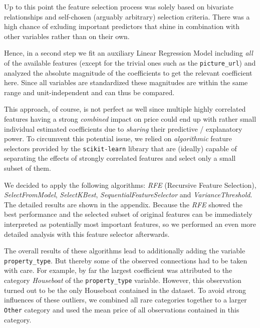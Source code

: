 \documentclass[12pt, letterpaper]{article}
\begin{document}
Up to this point the feature selection process was solely based on bivariate relationships and self-chosen (arguably arbitrary) selection criteria.
There was a high chance of exluding important predictors that shine in combination with other variables rather than on their own.

Hence, in a second step we fit an auxiliary Linear Regression Model including \emph{all} of the available features (except for the trivial ones such as the \verb|picture_url|) and analyzed the absolute magnitude of the coefficients to get the relevant coefficient here. 
Since all variables are standardized these magnitudes are within the same range and unit-independent and can thus be compared.

This approach, of course, is not perfect as well since multiple highly correlated features having a strong \emph{combined} impact on price could end up with rather small individual estimated coefficients due to \emph{sharing} their predictive / explanatory power.
To circumvent this potential issue, we relied on \emph{algorithmic} feature selectors provided by the \texttt{scikit-learn} library that are (ideally) capable of separating the effects of strongly correlated features and select only a small subset of them. 

We decided to apply the following algorithms: \textit{RFE} (Recursive Feature Selection), \textit{SelectFromModel}, \textit{SelectKBest}, \textit{SequentialFeatureSelector} and \textit{VarianceThreshold}. The detailed results are shown in the appendix.
Because the \textit{RFE} showed the best performance and the selected subset of original features can be immediately interpreted as potentially most important features, so we performed an even more detailed analysis with this feature selector afterwards. 

The overall results of these algorithms lead to additionally adding the variable \texttt{property\_type}. But thereby some of the observed connections had to be taken with care. For example, by far the largest coefficient was attributed to the category \emph{Houseboat} of the \verb|property_type| variable.
However, this observation turned out to be the only Houseboat contained in the dataset.
To avoid strong influences of these outliers, we combined all rare categories together to a larger \texttt{Other} category and used the mean price of all observations contained in this category.
\end{document}
